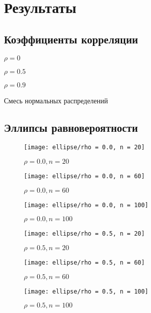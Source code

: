 \documentclass[12pt,a4paper]{article}
\begin{document}
\section{Результаты}
\subsection{Коэффициенты корреляции}
\begin{table}[h!]
	\centering
	
	\caption{$\rho = 0$}
\end{table}
\begin{table}[h!]
	\centering
	
	\caption{$\rho = 0.5$}
\end{table}
\pagebreak

\begin{table}[h!]
	\centering
	
	\caption{$\rho = 0.9$}
\end{table}

\begin{table}[h!]
	\centering
	
	\caption{Смесь нормальных распределений}
\end{table}
\pagebreak

\subsection{Эллипсы равновероятности}
\begin{figure}[h!]
	\centering
	\texttt{[image: ellipse/rho = 0.0, n = 20]}
	\caption{$\rho = 0.0, n = 20$}
	\label{fig:image1}
\end{figure}
\begin{figure}[h!]
	\centering
	\texttt{[image: ellipse/rho = 0.0, n = 60]}
	\caption{$\rho = 0.0, n = 60$}
	\label{fig:image2}
\end{figure}
\pagebreak

\begin{figure}[h!]
	\centering
	\texttt{[image: ellipse/rho = 0.0, n = 100]}
	\caption{$\rho = 0.0, n = 100$}
	\label{fig:image3}
\end{figure}
\begin{figure}[h!]
	\centering
	\texttt{[image: ellipse/rho = 0.5, n = 20]}
	\caption{$\rho = 0.5, n = 20$}
	\label{fig:image4}
\end{figure}
\pagebreak

\begin{figure}[h!]
	\centering
	\texttt{[image: ellipse/rho = 0.5, n = 60]}
	\caption{$\rho = 0.5, n = 60$}
	\label{fig:image5}
\end{figure}
\begin{figure}[h!]
	\centering
	\texttt{[image: ellipse/rho = 0.5, n = 100]}
	\caption{$\rho = 0.5, n = 100$}
	\label{fig:image6}
\end{figure}
\pagebreak
\end{document}
